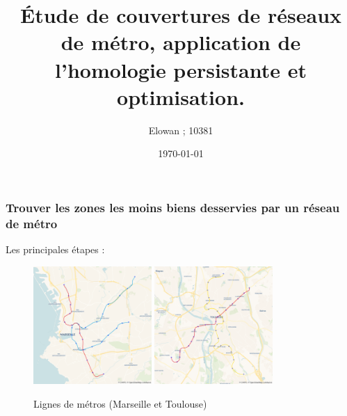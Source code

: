 \documentclass{beamer}
\begin{document}
\title{Étude de couvertures de réseaux de métro, application de 
l'homologie persistante et optimisation.}
\author{Elowan ; 10381}
\date{\today}

\maketitle

\begin{frame}
    \frametitle{Trouver les zones les moins biens desservies par un réseau de métro}    
    Les principales étapes : 

    \begin{figure}
        \includegraphics[width=0.4\textwidth]{../images/marseille_blank.png}
        \hfill
        \includegraphics[width=0.4\textwidth]{../images/toulouse_blank.png}
        \centering
        \caption{Lignes de métros (Marseille et Toulouse)}
    \end{figure}
    
    
\end{frame}
\end{document}
